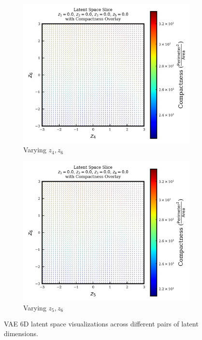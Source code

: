 \documentclass{article}
\begin{document}
\begin{figure}[H]
    \begin{subfigure}{0.3\textwidth}
        \includegraphics[width=\linewidth]{figures/VAEmodels/model5/varying_z4_z6_fixed_z1=0.0_z2=0.0_z3=0.0_z5=0.0.png}
        \caption{Varying $z_4, z_6$}
    \end{subfigure}
    \hfill
    \begin{subfigure}{0.3\textwidth}
        \includegraphics[width=\linewidth]{figures/VAEmodels/model5/varying_z5_z6_fixed_z1=0.0_z2=0.0_z3=0.0_z4=0.0.png}
        \caption{Varying $z_5, z_6$}
    \end{subfigure}

    \caption{VAE 6D latent space visualizations across different pairs of latent dimensions.}
    \label{fig:vae_model5}
\end{figure}









\newpage{}


\end{document}

